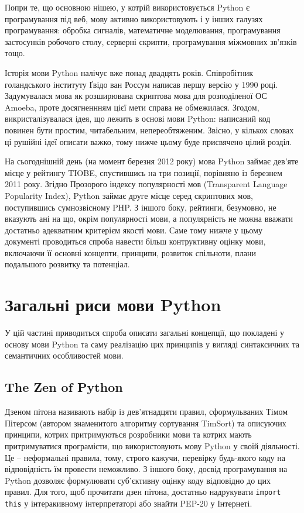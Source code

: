 \documentclass[a4paper, 12pt, onsedie]{article}
\begin{document}
    Попри те, що основною нішею, у котрій використовується Python є програмування під веб, мову активно використовують і
    у інших галузях програмування: обробка сигналів, математичне моделювання, програмування застосунків робочого
    столу, серверні скрипти, програмування міжмовних зв'язків тощо.

    Історія мови Python налічує вже понад двадцять років. Співробітник голандського інституту Ґвідо ван Россум
    написав першу версію у 1990 році. Задумувалася мова як розширювана скриптова мова для розподіленої ОС Amoeba,
    проте досягненнням цієї мети справа не обмежилася. Згодом, викристалізувалася ідея, що лежить в основі
    мови Python: написаний код повинен бути простим, читабельним, непереобтяженим. Звісно, у кількох словах ці
    рушійні ідеї описати важко, тому нижче цьому буде присвячено цілий розділ.

    На сьогоднішній день (на момент березня 2012 року) мова Python займає дев'яте місце у рейтингу TIOBE,
    спустившись на три позиції, порівняно із березнем 2011 року. Згідно Прозорого індексу популярності мов 
    (Transparent Language Popularity Index), Python займає друге місце серед скриптових мов, поступившись 
    сумнозвісному PHP. З іншого боку, рейтинги, безумовно, не вказують ані на що, окрім популярності мови,
    а популярність не можна вважати достатньо адекватним критерієм якості мови. Саме тому нижче у цьому документі 
    проводиться спроба навести більш контруктивну оцінку мови, включаючи її основні концепти, принципи, розвиток 
    спільноти, плани подальшого розвитку та потенціал. 

\section{Загальні риси мови Python}
    У цій частині приводиться спроба описати загальні концепції, що покладені у основу мови Python та саму реалізацію
    цих принципів у вигляді синтаксичних та семантичних особливостей мови.

\subsection{The Zen of Python}
    Дзеном пітона називають набір із дев'ятнадцяти правил, сформульваних Тімом Пітерсом (автором знаменитого алгоритму
    сортування TimSort) та описуючих принципи, котрих притримуються розробники мови та котрих мають притримуватися
    програмісти, що використовують мову Python у своїй діяльності. Це -- неформальні правила, тому, строго кажучи, перевірку 
    будь-якого коду на відповідність їм провести неможливо. З іншого боку, досвід програмування на Python дозволяє
    формулювати суб'єктивну оцінку коду відповідно до цих правил. Для того, щоб прочитати дзен пітона, достатньо надрукувати
    \texttt{import this} у інтеракивному інтерпретаторі або знайти PEP-20 у Інтернеті.
\end{document}
